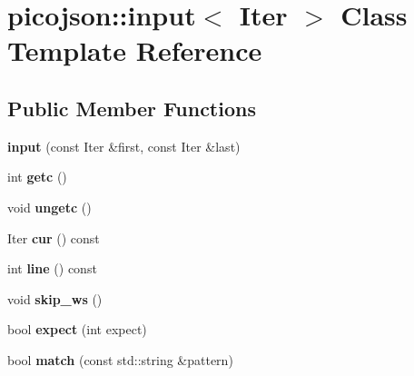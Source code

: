 \hypertarget{classpicojson_1_1input}{\section{picojson\+:\+:input$<$ Iter $>$ Class Template Reference}
\label{classpicojson_1_1input}
}
\subsection*{Public Member Functions}
\begin{DoxyCompactItemize}
\item 
\hypertarget{classpicojson_1_1input_ab1ca217622d921118707de9e9011a62f}{{\bfseries input} (const Iter \&first, const Iter \&last)}\label{classpicojson_1_1input_ab1ca217622d921118707de9e9011a62f}

\item 
\hypertarget{classpicojson_1_1input_a3e8ba0b09a989efa0dc583096984ea8e}{int {\bfseries getc} ()}\label{classpicojson_1_1input_a3e8ba0b09a989efa0dc583096984ea8e}

\item 
\hypertarget{classpicojson_1_1input_a96ccc244e73b2ab87ded38c98e98d573}{void {\bfseries ungetc} ()}\label{classpicojson_1_1input_a96ccc244e73b2ab87ded38c98e98d573}

\item 
\hypertarget{classpicojson_1_1input_abb0bb5b0fdf2604bcdbb65406dc773ca}{Iter {\bfseries cur} () const }\label{classpicojson_1_1input_abb0bb5b0fdf2604bcdbb65406dc773ca}

\item 
\hypertarget{classpicojson_1_1input_a24faf1a7e714ee88a4fb43ec4fc7164a}{int {\bfseries line} () const }\label{classpicojson_1_1input_a24faf1a7e714ee88a4fb43ec4fc7164a}

\item 
\hypertarget{classpicojson_1_1input_aa83aefe87374a5e24ab8c8e80fef4aa4}{void {\bfseries skip\+\_\+ws} ()}\label{classpicojson_1_1input_aa83aefe87374a5e24ab8c8e80fef4aa4}

\item 
\hypertarget{classpicojson_1_1input_a14c29e99d9c9aa8cdbb46178c434d663}{bool {\bfseries expect} (int expect)}\label{classpicojson_1_1input_a14c29e99d9c9aa8cdbb46178c434d663}

\item 
\hypertarget{classpicojson_1_1input_ad15f360122daf49ddf7a2a8591fa4364}{bool {\bfseries match} (const std\+::string \&pattern)}\label{classpicojson_1_1input_ad15f360122daf49ddf7a2a8591fa4364}

\end{DoxyCompactItemize}
